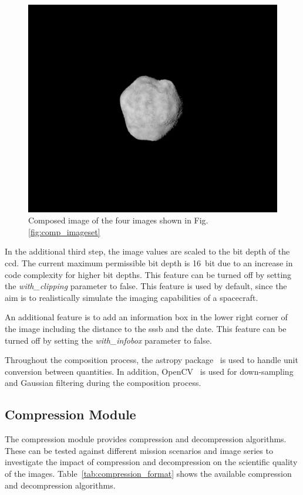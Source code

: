 \begin{figure}[htb]
    \centering
    \includegraphics[width=\textwidth]{doc/thesis/0_figures/composition/Comp_2017-08-15T115854-575000.png}
    \caption{Composed image of the four images shown in Fig. \ref{fig:comp_imageset}}
    \label{fig:comp_composed}
\end{figure}

In the additional third step, the image values are scaled to the bit depth of the \gls{ccd}. The current maximum permissible bit depth is \SI{16}{bit} due to an increase in code complexity for higher bit depths. This feature can be turned off by setting the \textit{with\_clipping} parameter to false. This feature is used by default, since the aim is to realistically simulate the imaging capabilities of a spacecraft.

An additional feature is to add an information box in the lower right corner of the image including the distance to the \gls{sssb} and the date. This feature can be turned off by setting the \textit{with\_infobox} parameter to false.

Throughout the composition process, the astropy package~\cite{robitaille2013astropy, price2018astropy} is used to handle unit conversion between quantities. In addition, OpenCV~\cite{opencv_library} is used for down-sampling and Gaussian filtering during the composition process.

\subsection{Compression Module}
The compression module provides compression and decompression algorithms. These can be tested against different mission scenarios and image series to investigate the impact of compression and decompression on the scientific quality of the images. Table~\ref{tab:compression_format} shows the available compression and decompression algorithms.

